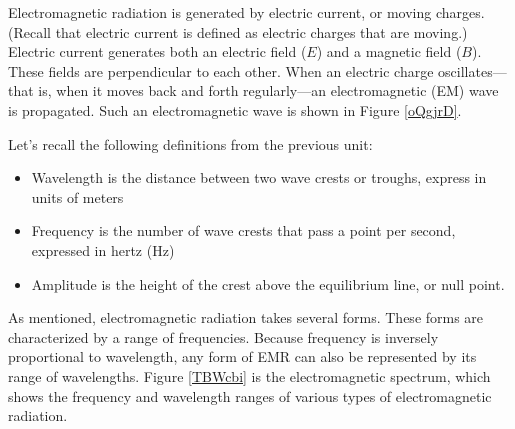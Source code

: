 \documentclass[main.tex]{subfiles}
\begin{document}
\vspace{1em}

Electromagnetic radiation is generated by electric current, or moving charges. (Recall that electric current is defined as electric charges that are moving.) Electric current generates both an electric field ($E$) and a magnetic field ($B$). These fields are perpendicular to each other. When an electric charge oscillates---that is, when it moves back and forth regularly---an electromagnetic (EM) wave is propagated. Such an electromagnetic wave is shown in Figure \ref{oQgjrD}.

\begin{center}
    \captionsetup{type=figure,margin=1in,font=scriptsize}
    \label{oQgjrD}
\end{center}

Let's recall the following definitions from the previous unit:

\begin{itemize}
\setlength\itemsep{-0.5ex}
    \item Wavelength is the distance between two wave crests or troughs, express in units of meters
    \item Frequency is the number of wave crests that pass a point per second, expressed in hertz (Hz)
    \item Amplitude is the height of the crest above the equilibrium line, or null point.
\end{itemize}

As mentioned, electromagnetic radiation takes several forms. These forms are characterized by a range of frequencies. Because frequency is inversely proportional to wavelength, any form of EMR can also be represented by its range of wavelengths. Figure \ref{TBWcbi} is the electromagnetic spectrum, which shows the frequency and wavelength ranges of various types of electromagnetic radiation.
\end{document}
